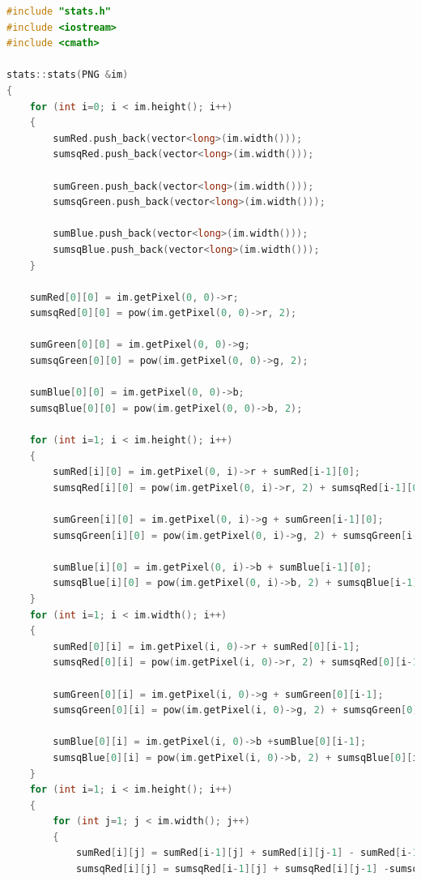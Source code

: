 \documentclass[UTF8]{ctexart}
\begin{document}
	\begin{lstlisting}[language=C++,caption={stats.cpp},label={stats.cpp}]
#include "stats.h"
#include <iostream>
#include <cmath>

stats::stats(PNG &im)
{
    for (int i=0; i < im.height(); i++)
    {
        sumRed.push_back(vector<long>(im.width()));
        sumsqRed.push_back(vector<long>(im.width()));

        sumGreen.push_back(vector<long>(im.width()));
        sumsqGreen.push_back(vector<long>(im.width()));

        sumBlue.push_back(vector<long>(im.width()));
        sumsqBlue.push_back(vector<long>(im.width()));
    }
    
    sumRed[0][0] = im.getPixel(0, 0)->r;
    sumsqRed[0][0] = pow(im.getPixel(0, 0)->r, 2);
    
    sumGreen[0][0] = im.getPixel(0, 0)->g;
    sumsqGreen[0][0] = pow(im.getPixel(0, 0)->g, 2);
    
    sumBlue[0][0] = im.getPixel(0, 0)->b;
    sumsqBlue[0][0] = pow(im.getPixel(0, 0)->b, 2);

    for (int i=1; i < im.height(); i++)
    {
        sumRed[i][0] = im.getPixel(0, i)->r + sumRed[i-1][0];
        sumsqRed[i][0] = pow(im.getPixel(0, i)->r, 2) + sumsqRed[i-1][0];

        sumGreen[i][0] = im.getPixel(0, i)->g + sumGreen[i-1][0];
        sumsqGreen[i][0] = pow(im.getPixel(0, i)->g, 2) + sumsqGreen[i-1][0];

        sumBlue[i][0] = im.getPixel(0, i)->b + sumBlue[i-1][0];
        sumsqBlue[i][0] = pow(im.getPixel(0, i)->b, 2) + sumsqBlue[i-1][0];
    }
    for (int i=1; i < im.width(); i++)
    {
        sumRed[0][i] = im.getPixel(i, 0)->r + sumRed[0][i-1];
        sumsqRed[0][i] = pow(im.getPixel(i, 0)->r, 2) + sumsqRed[0][i-1];

        sumGreen[0][i] = im.getPixel(i, 0)->g + sumGreen[0][i-1];
        sumsqGreen[0][i] = pow(im.getPixel(i, 0)->g, 2) + sumsqGreen[0][i-1];

        sumBlue[0][i] = im.getPixel(i, 0)->b +sumBlue[0][i-1];
        sumsqBlue[0][i] = pow(im.getPixel(i, 0)->b, 2) + sumsqBlue[0][i-1];
    }
    for (int i=1; i < im.height(); i++)
    {
        for (int j=1; j < im.width(); j++)
        {
            sumRed[i][j] = sumRed[i-1][j] + sumRed[i][j-1] - sumRed[i-1][j-1] + im.getPixel(j, i)->r;
            sumsqRed[i][j] = sumsqRed[i-1][j] + sumsqRed[i][j-1] -sumsqRed[i-1][j-1] + pow(im.getPixel(j, i)->r, 2);


\end{lstlisting}
\end{document}
